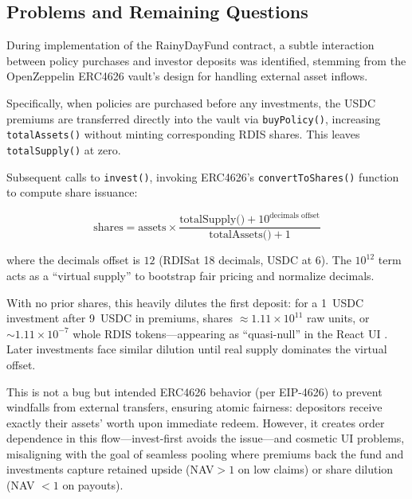 \documentclass[11pt,a4paper]{article}
\begin{document}
        \FloatBarrier

    \subsection{Problems and Remaining Questions}\label{subsec:problems-and-remaining-questions}

        During implementation of the RainyDayFund contract, a subtle interaction between policy purchases and investor deposits was identified, stemming from the OpenZeppelin ERC4626 vault's design for handling external asset inflows.

        Specifically, when policies are purchased before any investments, the USDC premiums are transferred directly into the vault via \texttt{buyPolicy()}, increasing \texttt{totalAssets()} without minting corresponding RDIS shares.
        This leaves \texttt{totalSupply()} at zero.

        Subsequent calls to \texttt{invest()}, invoking ERC4626's \texttt{convertToShares()} function to compute share issuance:

        \[
        \text{shares} = \text{assets} \times \frac{\text{totalSupply()} + 10^{\text{decimals offset}}}{\text{totalAssets()} + 1}
        \]

        where the decimals offset is $12$ (RDIS\footnotemark at 18 decimals, USDC at 6). 
        The $10^{12}$ term acts as a ``virtual supply'' to bootstrap fair pricing and normalize decimals.

        With no prior shares, this heavily dilutes the first deposit: for a 1~USDC investment after 9~USDC in premiums, shares $\approx 1.11 \times 10^{11}$ raw units, or $\sim 1.11 \times 10^{-7}$ whole RDIS tokens---appearing as ``quasi-null'' in the React UI .
        Later investments face similar dilution until real supply dominates the virtual offset.

        This is not a bug but intended ERC4626 behavior (per EIP-4626\footnotemark) to prevent windfalls from external transfers, ensuring atomic fairness: depositors receive exactly their assets' worth upon immediate redeem. 
        However, it creates order dependence in this flow---invest-first avoids the issue---and cosmetic UI problems, misaligning with the goal of seamless pooling where premiums back the fund and investments capture retained upside (NAV\footnotemark $> 1$ on low claims) or share dilution (NAV $< 1$ on payouts). 
\end{document}
